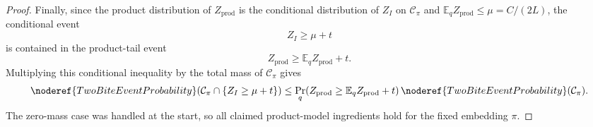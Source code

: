 \begin{proof}
Finally, since the product distribution of \(Z_{\mathrm{prod}}\) is the
conditional distribution of \(Z_I\) on \(\mathcal C_\pi\) and
\(\mathbb E_qZ_{\mathrm{prod}}\le \mu=C/(2L)\), the conditional event
\[
Z_I\ge \mu+t
\]
is contained in the product-tail event
\[
Z_{\mathrm{prod}}\ge \mathbb E_qZ_{\mathrm{prod}}+t.
\]
Multiplying this conditional inequality by the total mass of
\(\mathcal C_\pi\) gives
\[
\noderef{TwoBiteEventProbability}
  (\mathcal C_\pi\cap\{Z_I\ge\mu+t\})
\le
\Pr_q(Z_{\mathrm{prod}}\ge\mathbb E_qZ_{\mathrm{prod}}+t)\,
\noderef{TwoBiteEventProbability}(\mathcal C_\pi).
\]
The zero-mass case was handled at the start, so all claimed product-model
ingredients hold for the fixed embedding \(\pi\).
\end{proof}
